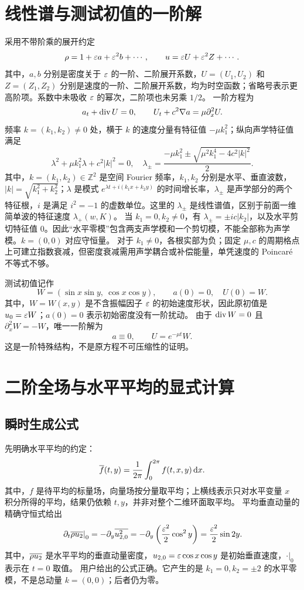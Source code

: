 \section{线性谱与测试初值的一阶解}
采用不带阶乘的展开约定
\begin{equation}\label{eq:series}
 \rho=1+\varepsilon a+\varepsilon^2b+\cdots,\qquad
 u=\varepsilon U+\varepsilon^2 Z+\cdots.
\end{equation}
其中，$a,b$ 分别是密度关于 $\varepsilon$ 的一阶、二阶展开系数，$U=(U_1,U_2)$ 和 $Z=(Z_1,Z_2)$ 分别是速度的一阶、二阶展开系数，均为时空函数；省略号表示更高阶项。系数中未吸收 $\varepsilon$ 的幂次，二阶项也未另乘 $1/2$。
一阶方程为
\begin{equation}\label{eq:linear}
 a_t+\operatorname{div} U=0,\qquad U_t+c^2\nabla a=\mu\partial_x^2U.
\end{equation}
频率 $k=(k_1,k_2)\ne0$ 处，横于 $k$ 的速度分量有特征值 $-\mu k_1^2$；纵向声学特征值满足
\begin{equation}\label{eq:spectrum}
 \lambda^2+\mu k_1^2\lambda+c^2|k|^2=0,
 \quad \lambda_\pm=\frac{-\mu k_1^2\pm\sqrt{\mu^2 k_1^4-4c^2|k|^2}}2.
\end{equation}
其中，$k=(k_1,k_2)\in\mathbb Z^2$ 是空间 Fourier 频率，$k_1,k_2$ 分别是水平、垂直波数，$|k|=\sqrt{k_1^2+k_2^2}$；$\lambda$ 是模式 $e^{\lambda t+i(k_1x+k_2y)}$ 的时间增长率，$\lambda_\pm$ 是声学部分的两个特征根，$i$ 是满足 $i^2=-1$ 的虚数单位。这里的 $\lambda_\pm$ 是线性谱值，区别于前面一维简单波的特征速度 $\lambda_+(w,K)$。
当 $k_1=0,k_2\ne0$，有 $\lambda_\pm=\pm ic|k_2|$，以及水平剪切特征值 $0$。因此“水平零模”包含两支声学模和一个剪切模，不能全部称为声学模。$k=(0,0)$ 对应守恒量。
对于 $k_1\ne0$，各根实部为负；固定 $\mu,c$ 的周期格点上可建立指数衰减，但密度衰减需用声学耦合或补偿能量，单凭速度的 Poincar\'e 不等式不够。

测试初值记作
\[
 W=(\sin x\sin y,\ \cos x\cos y),\qquad a(0)=0,\quad U(0)=W.
\]
其中，$W=W(x,y)$ 是不含振幅因子 $\varepsilon$ 的初始速度形状，因此原初值是 $u_0=\varepsilon W$；$a(0)=0$ 表示初始密度没有一阶扰动。
由于 $\operatorname{div} W=0$ 且 $\partial_x^2W=-W$，唯一一阶解为
\begin{equation}\label{eq:first}
 a\equiv0,\qquad U=e^{-\mu t}W.
\end{equation}
这是一阶特殊结构，不是原方程不可压缩性的证明。

\section{二阶全场与水平平均的显式计算}
\subsection{瞬时生成公式}
先明确水平平均的约定：
\[
 \overline{f}(t,y)=\frac1{2\pi}\int_0^{2\pi}f(t,x,y)\,\mathrm d x.
\]
其中，$f$ 是待平均的标量场，向量场按分量取平均；上横线表示只对水平变量 $x$ 积分所得的平均，结果仍依赖 $t,y$，并非对整个二维环面取平均。
平均垂直动量的精确守恒式给出
\[
 \left.\partial_t\overline{\rho u_2}\right|_0
 =-\partial_y\overline{u_{2,0}^2}
 =-\partial_y\left(\frac{\varepsilon^2}2\cos^2y\right)
 =\frac{\varepsilon^2}2\sin2y.
\]
其中，$\overline{\rho u_2}$ 是水平平均的垂直动量密度，$u_{2,0}=\varepsilon\cos x\cos y$ 是初始垂直速度，$\left.\cdot\right|_0$ 表示在 $t=0$ 取值。
用户给出的公式正确。它产生的是 $k_1=0,k_2=\pm2$ 的水平零模，不是总动量 $k=(0,0)$；后者仍为零。

